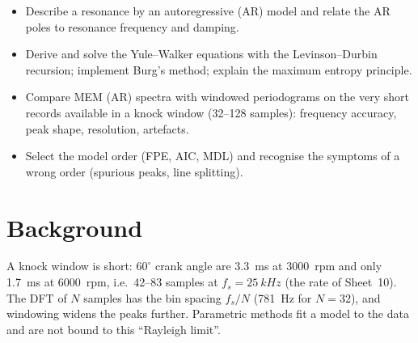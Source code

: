 
\begin{goals}
\begin{itemize}
  \item Describe a resonance by an autoregressive (AR) model and relate the AR
    poles to resonance frequency and damping.
  \item Derive and solve the Yule--Walker equations with the Levinson--Durbin
    recursion; implement Burg's method; explain the maximum entropy principle.
  \item Compare MEM (AR) spectra with windowed periodograms on the very short
    records available in a knock window (32--128 samples): frequency accuracy,
    peak shape, resolution, artefacts.
  \item Select the model order (FPE, AIC, MDL) and recognise the symptoms of a
    wrong order (spurious peaks, line splitting).
\end{itemize}
\end{goals}

\section*{Background}

A knock window is short: $60^\circ$ crank angle are \SI{3.3}{ms} at
\SI{3000}{rpm} and only \SI{1.7}{ms} at \SI{6000}{rpm}, i.e.\ 42--83 samples at
$f_s=\SI{25}{kHz}$ (the rate of Sheet~10). The DFT of $N$ samples has the bin spacing
$f_s/N$ (\SI{781}{Hz} for $N=32$), and windowing widens the peaks further. Parametric
methods fit a model to the data and are not bound to this ``Rayleigh limit''.

